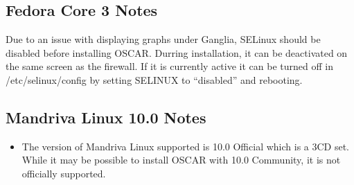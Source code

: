 
\subsection{Fedora Core 3 Notes}
\label{subsec:fc3notes}

  Due to an issue with displaying graphs under Ganglia, SELinux should
  be disabled before installing OSCAR.  Durring installation, it can be
  deactivated on the same screen as the firewall.  If it is currently
  active it can be turned off in /etc/selinux/config by setting SELINUX 
  to ``disabled'' and rebooting.



\subsection{Mandriva Linux 10.0 Notes}
\label{subsec:mdk10notes}

\begin{itemize}

\item The version of Mandriva Linux supported is 10.0 Official which is a
3CD set.  While it may be possible to install OSCAR with 10.0 Community,
it is not officially supported.

\end{itemize}
